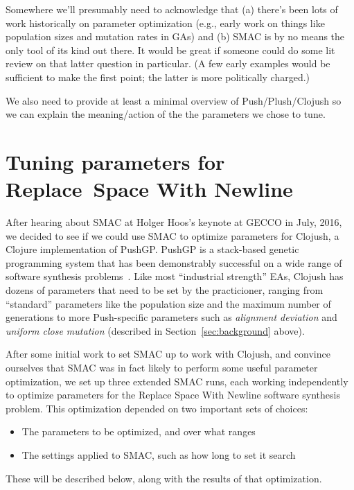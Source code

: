Somewhere we'll presumably need to acknowledge that (a) there's been lots of
work historically on parameter optimization (e.g., early work on things like
population sizes and mutation rates in GAs) and (b) SMAC is by no means the
only tool of its kind out there. It would be great if someone could do some
lit review on that latter question in particular. (A few early examples would
be sufficient to make the first point; the latter is more politically charged.)

We also need to provide at least a minimal overview of Push/Plush/Clojush so
we can explain the meaning/action of the the parameters we chose to tune. 

\section{Tuning parameters for Replace~Space With Newline}
\label{sec:tuningRSWN}



After hearing about SMAC at Holger Hoos's keynote at GECCO in July, 2016, we
decided to see if we could use SMAC to optimize parameters for Clojush, a
Clojure implementation of PushGP. PushGP is a stack-based genetic programming
system that has been demonstrably successful on a wide range of software
synthesis problems~\cite{Helmuth:2015:GECCO}. Like most ``industrial
strength'' EAs, Clojush has dozens of parameters that need to be set by the
practicioner, ranging from ``standard'' parameters like the population size
and the maximum number of generations to more Push-specific parameters
such as \emph{alignment deviation} and \emph{uniform close mutation} (described
in Section~\ref{sec:background} above).

After some initial work to set SMAC up to work with Clojush, and convince
ourselves that SMAC was in fact likely to perform some useful parameter
optimization, we set up three extended SMAC runs, each working independently
to optimize parameters for the Replace Space With Newline software synthesis 
problem.
This optimization depended on two important sets of choices:
\begin{itemize}
	\item The parameters to be optimized, and over what ranges
	\item The settings applied to SMAC, such as how long to set it search
\end{itemize}
These will be described below, along with the results of that optimization.

